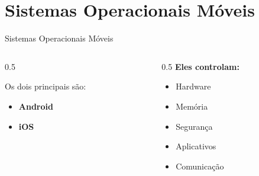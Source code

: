 \documentclass[aspectratio=169]{beamer}
\begin{document}
\section{Sistemas Operacionais Móveis}

\begin{frame}{Sistemas Operacionais Móveis}
    \begin{columns}[T]
        \begin{column}{0.5\textwidth}
            \begin{block}{Os dois principais são:}
                \begin{itemize}
                    \item \textbf{Android}
                    \item \textbf{iOS}
                \end{itemize}
            \end{block}
        \end{column}
        \begin{column}{0.5\textwidth}
            \textbf{Eles controlam:}
            \begin{itemize}
                \item Hardware
                \item Memória
                \item Segurança
                \item Aplicativos
                \item Comunicação
            \end{itemize}
        \end{column}
    \end{columns}
\end{frame}
\end{document}

